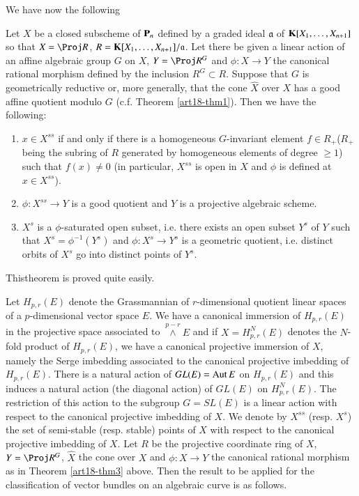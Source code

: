 We have now the following

\begin{theorem}\label{art18-thm3}
Let $X$ be a closed subscheme of $\mathbf{P}_{n}$ defined by a graded ideal $\mathfrak{a}$ of $\mathbf{K}[X_{1},\ldots,X_{n+1}]$ so that $X=\Proj R$, $R=\mathbf{K}[X_{1},\ldots,X_{n+1}]/\mathfrak{a}$. Let there be given a linear action of an affine algebraic group $G$ on $X$, $Y=\Proj R^{G}$ and $\phi:X\to Y$ the canonical rational morphism defined by the inclusion $R^{G}\subset R$. Suppose that $G$ is geometrically reductive or, more generally, that the cone $\widehat{X}$ over $X$ has a good affine quotient modulo $G$ (c.f. Theorem \ref{art18-thm1}). Then we have the following:
\begin{enumerate}
\renewcommand{\labelenumi}{(\rm\theenumi)}
\item $x\in X^{ss}$ if and only if there is a homogeneous $G$-invariant element $f\in R_{+}$($R_{+}$ being the subring of $R$ generated by homogeneous elements of degree $\geq 1$) such that $f(x)\neq 0$ (in particular, $X^{ss}$ is open in $X$ and $\phi$ is defined at $x\in X^{ss}$).

\item $\phi:X^{ss}\to Y$ is a good quotient and $Y$ is a projective algebraic scheme.

\item $X^{s}$ is a $\phi$-saturated open subset, i.e. there exists an open subset $Y^{s}$ of $Y$ such that $X^{s}=\phi^{-1}(Y^{s})$ and $\phi:X^{s}\to Y^{s}$ is a geometric quotient, i.e. distinct orbits of $X^{s}$ go into distinct points of $Y^{s}$.
\end{enumerate}
\end{theorem}

This\pageoriginale theorem is proved quite easily.

Let $H_{p,r}(E)$ denote the Grassmannian of $r$-dimensional quotient linear spaces of a $p$-dimensional vector space $E$. We have a canonical immersion of $H_{p,r}(E)$ in the projective space associated to ${\displaystyle{\mathop{\wedge}\limits^{p-r}}}E$ and if $X=H^{N}_{p,r}(E)$ denotes the $N$-fold product of $H_{p,r}(E)$, we have a canonical projective immersion of $X$, namely the Serge imbedding associated to the canonical projective imbedding of $H_{p,r}(E)$. There is a natural action of $GL(E)=\operatorname{\mathrm{Aut}} E$ on $H_{p,r}(E)$ and this induces a natural action (the diagonal action) of $GL(E)$ on $H^{N}_{p,r}(E)$. The restriction of this action to the subgroup $G=SL(E)$ is a linear action with respect to the canonical projective imbedding of $X$. We denote by $X^{ss}$ (resp. $X^{s}$) the set of semi-stable (resp. stable) points of $X$ with respect to the canonical projective imbedding of $X$. Let $R$ be the projective coordinate ring of $X$, $Y=\Proj R^{G}$, $\widehat{X}$ the cone over $X$ and $\phi:X\to Y$ the canonical rational morphism as in Theorem \ref{art18-thm3} above. Then the result to be applied for the classification of vector bundles on an algebraic curve is as follows.

